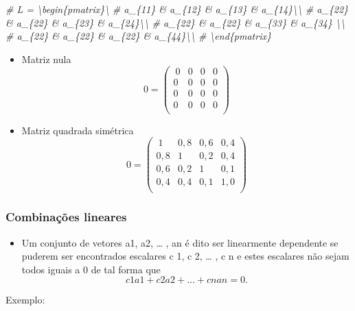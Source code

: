 \documentclass[
]{article}
\newenvironment{Shaded}{\begin{snugshade}}{\end{snugshade}}
\newcommand{\CommentTok}[1]{\textcolor[rgb]{0.56,0.35,0.01}{\textit{#1}}}
\providecommand{\tightlist}{%
  \setlength{\itemsep}{0pt}\setlength{\parskip}{0pt}}
\begin{document}
\begin{Shaded}
\begin{Highlighting}[]
\CommentTok{\# $$L = \textbackslash{}begin\{pmatrix\}\textbackslash{}}
\CommentTok{\# a\_\{11\} \& a\_\{12\} \& a\_\{13\} \& a\_\{14\}\textbackslash{}\textbackslash{}}
\CommentTok{\# a\_\{22\} \& a\_\{22\} \& a\_\{23\} \& a\_\{24\}\textbackslash{}\textbackslash{}}
\CommentTok{\# a\_\{22\} \& a\_\{22\} \& a\_\{33\} \& a\_\{34\} \textbackslash{}\textbackslash{}}
\CommentTok{\# a\_\{22\} \& a\_\{22\} \& a\_\{22\} \& a\_\{44\}\textbackslash{}\textbackslash{}}
\CommentTok{\# \textbackslash{}end\{pmatrix\}$$}
\end{Highlighting}
\end{Shaded}

\begin{itemize}
\item
  Matriz nula \[0 = \begin{pmatrix}\
  0 & 0 & 0 & 0\\
  0 & 0 & 0 & 0\\
  0 & 0 & 0 & 0 \\
  0 & 0 & 0 & 0\\
  \end{pmatrix}\]
\item
  Matriz quadrada simétrica \[0 = \begin{pmatrix}\
  1 & 0,8 & 0,6 & 0,4\\
  0,8 & 1 & 0,2 & 0,4\\
  0,6 & 0,2 & 1 & 0,1 \\
  0,4 & 0,4 & 0,1 & 1,0\\
  \end{pmatrix}\]
\end{itemize}

\hypertarget{combinauxe7uxf5es-lineares}{%
\subsubsection{Combinações lineares}\label{combinauxe7uxf5es-lineares}}

\begin{itemize}
\tightlist
\item
  Um conjunto de vetores a1, a2, \ldots{} , an é dito ser linearmente
  dependente se puderem ser encontrados escalares c 1, c 2, \ldots{} , c
  n e estes escalares não sejam todos iguais a 0 de tal forma que \[
  c 1a1 + c 2a2 + … + c nan = 0.
  \]
\end{itemize}

Exemplo:
\end{document}
